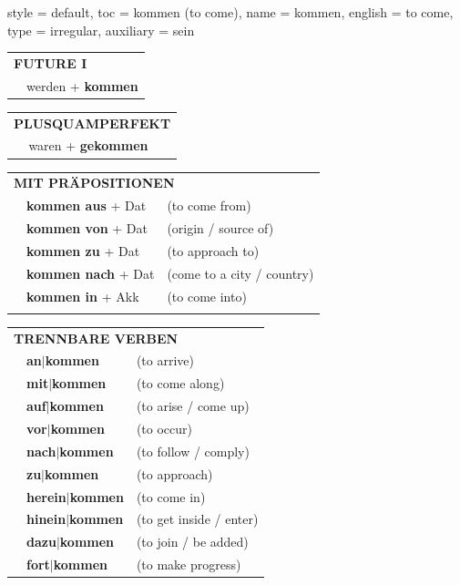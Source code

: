 \begin{verbentry}{
  style = {default},
  toc = {kommen (to come)},
  name = {kommen},
  english = {to come},
  type = {irregular},
  auxiliary = {sein}
}
\begin{tabular}{rl}
    \multicolumn{2}{l}{\textbf{FUTURE I} }\\
   & werden + \textbf{kommen}\\
 
  \end{tabular}
\hfill
   \begin{tabular}{rl}
      \multicolumn{2}{l}{\textbf{PLUSQUAMPERFEKT}}\\
   & waren + \textbf{gekommen}\\
  \end{tabular}

  \vspace{10pt}

   \begin{tabular}{lll}
      \multicolumn{3}{l}{\textbf{MIT PRÄPOSITIONEN}}\\
& \textbf{kommen aus} + Dat & (to come from)\\
& \textbf{kommen von} + Dat & (origin / source of)\\
&\textbf{kommen zu} + Dat & (to approach to)\\
&\textbf{kommen nach} + Dat & (come to a city / country)\\
&\textbf{kommen in} + Akk & (to come into)\\
\vspace{50pt}
  \end{tabular}
  \hfill
   \begin{tabular}{lll}
      \multicolumn{3}{l}{\textbf{TRENNBARE VERBEN}}\\
 & \textbf{an$|$kommen} & (to arrive)\\
 & \textbf{mit$|$kommen} & (to come along)\\
     & \textbf{auf$|$kommen} & (to arise / come up)\\
     & \textbf{vor$|$kommen} & (to occur)\\
     & \textbf{nach$|$kommen} & (to follow / comply)\\
     & \textbf{zu$|$kommen} & (to approach)\\
      & \textbf{herein$|$kommen} & (to come in)\\
     & \textbf{hinein$|$kommen} & (to get inside / enter)\\
     & \textbf{dazu$|$kommen} & (to join / be added)\\
      & \textbf{fort$|$kommen} & (to make progress)
  \end{tabular}

  \vspace{-5pt}
\end{verbentry}

